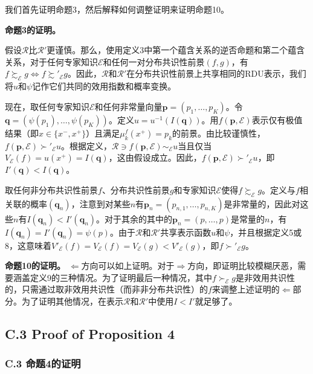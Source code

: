 \documentclass[12pt,a4paper]{article}
\newenvironment{translation}
  {\par\noindent{\color{transblue}\ignorespaces}}
  {\par\medskip}
\begin{document}
\begin{translation}
我们首先证明命题3，然后解释如何调整证明来证明命题10。

\textbf{命题3的证明。}

假设$\mathcal{R}$比$\mathcal{R}'$更谨慎。那么，使用定义3中第一个蕴含关系的逆否命题和第二个蕴含关系，对于任何专家知识$\mathcal{E}$和任何一对分布共识性前景$(f, g)$，有$f \succsim_{\mathcal{E}} g \iff f \succsim'_{\mathcal{E}} g$。因此，$\mathcal{R}$和$\mathcal{R}'$在分布共识性前景上共享相同的RDU表示，我们将$u$和$\psi$记作它们共同的效用指数和概率变换。

现在，取任何专家知识$\mathcal{E}$和任何非常量向量$\mathbf{p} = (p_{1}, \dots, p_{K})$。令$\mathbf{q} = (\psi(p_{1}), \dots, \psi(p_{K}))$。定义$u = u^{-1}(I(\mathbf{q}))$。用$f(\mathbf{p}, \mathcal{E})$表示仅有极值结果（即$x \in \{x^{-}, x^{+}\}$）且满足$\mu_{k}^{f}(x^{+}) = p_{k}$的前景。由比较谨慎性，$f(\mathbf{p}, \mathcal{E}) \succ'_{\mathcal{E}} u$。根据定义，$\mathcal{R} \ni f(\mathbf{p}, \mathcal{E}) \sim_{\mathcal{E}} u$当且仅当$V_{\mathcal{E}}(f) = u(x^{+}) = I(\mathbf{q})$，这由假设成立。因此，$f(\mathbf{p}, \mathcal{E}) \succ'_{\mathcal{E}} u$，即$I'(\mathbf{q}) < I(\mathbf{q})$。

取任何非分布共识性前景$f$、分布共识性前景$g$和专家知识$\mathcal{E}$使得$f \succsim_{\mathcal{E}} g$。定义与$f$相关联的概率$(\mathbf{q}_{n})$，注意到对某些$n$有$\mathbf{p}_{n} = (p_{n,1}, \dots, p_{n,K})$是非常量的，因此对这些$n$有$I(\mathbf{q}_{n}) < I'(\mathbf{q}_{n})$。对于其余的其中的$\mathbf{p}_{n} = (p, \dots, p)$是常量的$n$，有$I(\mathbf{q}_{n}) = I'(\mathbf{q}_{n}) = \psi(p)$。由于$\mathcal{R}$和$\mathcal{R}'$共享表示函数$u$和$\psi$，并且根据定义5或8，这意味着$V'_{\mathcal{E}}(f) = V_{\mathcal{E}}(f) = V_{\mathcal{E}}(g) < V'_{\mathcal{E}}(g)$，即$f \succ'_{\mathcal{E}} g$。

\textbf{命题10的证明。} $\Leftarrow$方向可以如上证明。对于$\Rightarrow$方向，即证明比较模糊厌恶，需要涵盖定义9的三种情况。为了证明最后一种情况，其中$f \succ_{\mathcal{E}} g$是非效用共识性的，只需通过取非效用共识性（而非非分布共识性）的$f$来调整上述证明的$\Leftarrow$部分。为了证明其他情况，在表示$\mathcal{R}$和$\mathcal{R}'$中使用$I < I'$就足够了。
\end{translation}

\subsection*{C.3 Proof of Proposition 4}
{\color{transblue}\subsubsection*{C.3 命题4的证明}}
\end{document}
